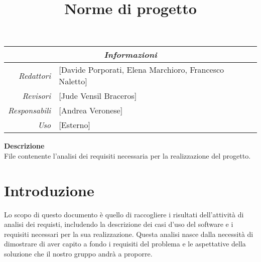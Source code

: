 \documentclass[12pt]{article}
\begin{document}
\graphicspath{ {../templates/img/} }

\title{Norme di progetto}

\firstPage

\maketitle

\begin{center}
    \begin{tabular}{r | l}
		\multicolumn{2}{c}{\textit{Informazioni}}\\
		\hline
		
			\textit{Redattori} &
			[Davide Porporati, Elena Marchioro, Francesco Naletto]\makecell{}\\

			\textit{Revisori} &
			[Jude Vensil Braceros]\makecell{}\\
			\textit{Responsabili} &
			[Andrea Veronese]\makecell{}\\
		      \textit{Uso} & 
                [Esterno]\makecell{}\\
    \end{tabular}
\end{center}

\begin{center}
    \textbf{Descrizione}\\
    File contenente l'analisi dei requisiti necessaria per la realizzazione del progetto.
\end{center}

\pagebreak

\tableofcontents
\pagebreak

\printindex 

\makeversioni

\section{Introduzione}
Lo scopo di questo documento è quello di raccogliere i risultati dell'attività di analisi dei requisti, includendo la descrizione dei casi d'uso del software e i requisiti necessari per la sua realizzazione.
Questa analisi nasce dalla necessità di dimostrare di aver capito a fondo i requisiti del problema e le aspettative della soluzione che il nostro gruppo andrà a proporre.
\end{document}
